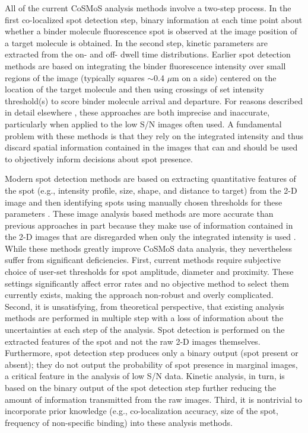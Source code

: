All of the current CoSMoS analysis methods involve a two-step process. In the first co-localized spot detection step, binary information at each time point about whether a binder molecule fluorescence spot is observed at the image position of a target molecule is obtained. In the second step, kinetic parameters are extracted from the on- and off- dwell time distributions. Earlier spot detection methods are based on integrating the binder fluorescence intensity over small regions of the image (typically squares $\sim$0.4 $\mu$m on a side) centered on the location of the target molecule and then using crossings of set intensity threshold(s) to score binder molecule arrival and departure. For reasons described in detail elsewhere \citep{Friedman2015-nx}, these approaches are both imprecise and inaccurate, particularly when applied to the low S/N images often used. A fundamental problem with these methods is that they rely on the integrated intensity and thus discard spatial information contained in the images that can and should be used to objectively inform decisions about spot presence.

Modern spot detection methods are based on extracting quantitative features of the spot (e.g., intensity profile, size, shape, and distance to target) from the 2-D image and then identifying spots using manually chosen thresholds for these parameters \citep{Friedman2015-nx, Smith2019-yb}. These image analysis based methods are more accurate than previous approaches in part because they make use of information contained in the 2-D images that are disregarded when only the integrated intensity is used \citep{Friedman2015-nx}. While these methods greatly improve CoSMoS data analysis, they nevertheless suffer from significant deficiencies. First, current methods require subjective choice of user-set thresholds for spot amplitude, diameter and proximity. These settings significantly affect error rates and no objective method to select them currently exists, making the approach non-robust and overly complicated. Second, it is unsatisfying, from theoretical perspective, that existing analysis methods are performed in multiple step with a loss of information about the uncertainties at each step of the analysis. Spot detection is performed on the extracted features of the spot and not the raw 2-D images themselves. Furthermore, spot detection step produces only a binary output (spot present or absent); they do not output the probability of spot presence in marginal images, a critical feature in the analysis of low S/N data. Kinetic analysis, in turn, is based on the binary output of the spot detection step further reducing the amount of information transmitted from the raw images. Third, it is nontrivial to incorporate prior knowledge (e.g., co-localization accuracy, size of the spot, frequency of non-specific binding) into these analysis methods.

